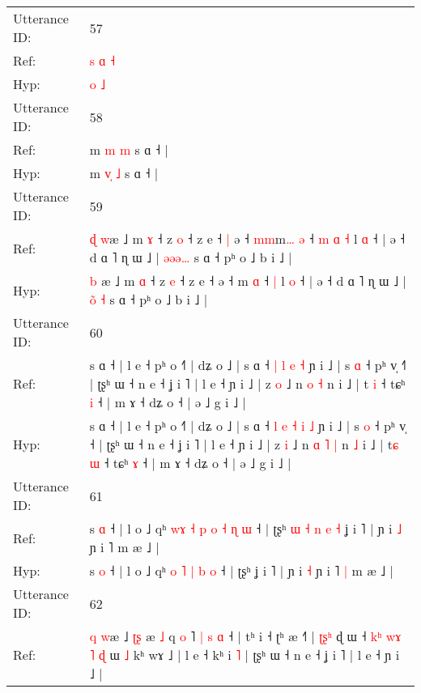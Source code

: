 \documentclass[10pt]{article}
\DeclareRobustCommand{\hl}[1]{{\textcolor{red}{#1}}}
\begin{document}
\begin{longtable}{ll}
 \\
\midrule
Utterance ID: & 57 \\
Ref: & \hl{s}\hl{ }\hl{ɑ} \hl{˧}
 \\
Hyp: & \hl{}\hl{}\hl{o} \hl{˩}
 \\
\midrule
Utterance ID: & 58 \\
Ref: & m \hl{}\hl{m} \hl{m} s ɑ ˧ |
 \\
Hyp: & m \hl{v}\hl{̩} \hl{˩} s ɑ ˧ |
 \\
\midrule
Utterance ID: & 59 \\
Ref: & \hl{ɖ} \hl{w}æ ˩ m \hl{ɤ} ˧ z \hl{o} ˧ z e ˧\hl{ }\hl{|} ə ˧ \hl{m}\hl{m}m\hl{…} \hl{ə} ˧\hl{ }\hl{m}\hl{ }\hl{ɑ} \hl{˧} l \hl{ɑ} ˧ | ə ˧ d ɑ ˥ ɳ ɯ ˩ | \hl{ə}\hl{ə}\hl{ə}\hl{…} s ɑ ˧ pʰ o ˩ b i ˩ |
 \\
Hyp: & \hl{b} \hl{}æ ˩ m \hl{ɑ} ˧ z \hl{e} ˧ z e ˧\hl{}\hl{} ə ˧ \hl{}\hl{}m\hl{} \hl{ɑ} ˧\hl{}\hl{}\hl{}\hl{} \hl{|} l \hl{o} ˧ | ə ˧ d ɑ ˥ ɳ ɯ ˩ | \hl{o}\hl{̃}\hl{ }\hl{˧} s ɑ ˧ pʰ o ˩ b i ˩ |
 \\
\midrule
Utterance ID: & 60 \\
Ref: & s ɑ ˧ | l e ˧ pʰ o ˧˥ | dʑ o ˩ | s ɑ ˧\hl{}\hl{} \hl{|} \hl{l} \hl{e} \hl{˧} ɲ i ˩ | s \hl{ɑ} ˧ pʰ v̩ ˧\hl{˥} | ʈʂʰ ɯ ˧ n e ˧ ʝ i ˥ | l e ˧ ɲ i ˩ | z \hl{o} ˩ n\hl{}\hl{} \hl{o} \hl{˧} n\hl{}\hl{} i ˩ | t\hl{} \hl{i} ˧ tɕʰ \hl{i} ˧ | m ɤ ˧ dʑ o ˧ | ə ˩ g i ˩ |
 \\
Hyp: & s ɑ ˧ | l e ˧ pʰ o ˧˥ | dʑ o ˩ | s ɑ ˧\hl{ }\hl{l} \hl{e} \hl{˧} \hl{i} \hl{˩} ɲ i ˩ | s \hl{o} ˧ pʰ v̩ ˧\hl{} | ʈʂʰ ɯ ˧ n e ˧ ʝ i ˥ | l e ˧ ɲ i ˩ | z \hl{i} ˩ n\hl{ }\hl{ɑ} \hl{˥} \hl{|} n\hl{ }\hl{˩} i ˩ | t\hl{ɕ} \hl{ɯ} ˧ tɕʰ \hl{ɤ} ˧ | m ɤ ˧ dʑ o ˧ | ə ˩ g i ˩ |
 \\
\midrule
Utterance ID: & 61 \\
Ref: & s \hl{ɑ} ˧ | l o ˩ qʰ\hl{ }\hl{w}\hl{ɤ}\hl{ }\hl{˧} \hl{p} \hl{o} \hl{˧} \hl{ɳ} \hl{ɯ} ˧ | ʈʂʰ\hl{ }\hl{ɯ}\hl{ }\hl{˧}\hl{ }\hl{n}\hl{ }\hl{e}\hl{ }\hl{˧} ʝ i ˥ | ɲ i \hl{˩} ɲ i ˥\hl{}\hl{} m æ ˩ |
 \\
Hyp: & s \hl{o} ˧ | l o ˩ qʰ\hl{}\hl{}\hl{}\hl{}\hl{} \hl{o} \hl{˥} \hl{|} \hl{b} \hl{o} ˧ | ʈʂʰ\hl{}\hl{}\hl{}\hl{}\hl{}\hl{}\hl{}\hl{}\hl{}\hl{} ʝ i ˥ | ɲ i \hl{˧} ɲ i ˥\hl{ }\hl{|} m æ ˩ |
 \\
\midrule
Utterance ID: & 62 \\
Ref: & \hl{q} \hl{w}æ ˩ \hl{ʈ}\hl{ʂ} æ \hl{˩} q \hl{}\hl{o} ˥ \hl{|} \hl{s}\hl{ }\hl{ɑ} ˧ | tʰ i ˧ ʈʰ æ ˧˥ |\hl{}\hl{} \hl{}\hl{ʈ}\hl{ʂ}\hl{ʰ} ɖ ɯ ˧ \hl{k}\hl{ʰ} \hl{w}\hl{ɤ} \hl{˥} \hl{}\hl{ɖ} ɯ \hl{˩} kʰ wɤ ˩ | l e ˧\hl{}\hl{}\hl{}\hl{} kʰ i \hl{˥} | ʈʂʰ ɯ ˧ n e ˧ ʝ i ˥ | l e ˧ ɲ i ˩ |

\end{longtable}
\end{document}
